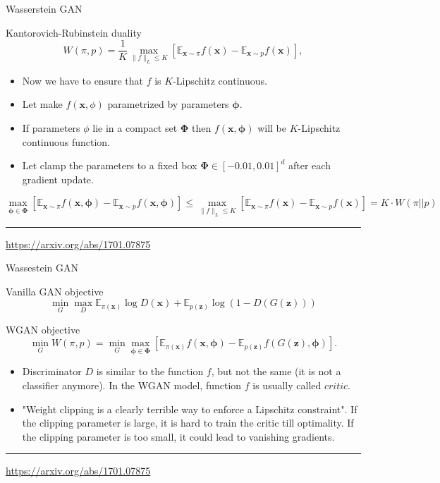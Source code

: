 \documentclass{beamer}
\newcommand{\bx}{\mathbf{x}}
\newcommand{\bz}{\mathbf{z}}
\newcommand{\bbE}{\mathbb{E}}
\newcommand{\bphi}{\boldsymbol{\phi}}
\begin{document}
\begin{frame}{Wasserstein GAN}
		\begin{block}{Kantorovich-Rubinstein duality}
		\[
			W(\pi, p) = \frac{1}{K} \max_{\| f \|_L \leq K} \left[ \bbE_{\bx \sim \pi} f(\bx)  - \bbE_{\bx \sim p} f(\bx)\right],
		\]
	\end{block}
	\begin{itemize}
		\item Now we have to ensure that $f$ is $K$-Lipschitz continuous.
		\item Let make $f(\bx, \phi)$ parametrized by parameters $\bphi$.
		\item If parameters $\phi$ lie in a compact set $\boldsymbol{\Phi}$ then $f(\bx, \bphi)$ will be $K$-Lipschitz continuous function. 
		\item Let clamp the parameters to a fixed box $\boldsymbol{\Phi} \in [-0.01, 0.01]^d$ after each gradient update.
	\end{itemize}
	{\footnotesize
	\[
		 \max_{\bphi \in \boldsymbol{\Phi}} \left[ \bbE_{\bx \sim \pi} f(\bx, \bphi)  - \bbE_{\bx \sim p} f(\bx, \bphi )\right] \leq  \max_{\| f \|_L \leq K} \left[ \bbE_{\bx \sim \pi} f(\bx)  - \bbE_{\bx \sim p} f(\bx)\right] = K \cdot W(\pi || p)
	\]}
	\vfill
	\hrule\medskip 
	{\scriptsize \href{https://arxiv.org/abs/1701.07875}{https://arxiv.org/abs/1701.07875}}
\end{frame}
\begin{frame}{Wassestein GAN}
	\begin{block}{Vanilla GAN objective}
		\vspace{-0.3cm}
		\[
			\min_{G} \max_D \bbE_{\pi(\bx)} \log D(\bx) + \bbE_{p(\bz)} \log (1 - D(G(\bz)))
		\]
	\end{block}
	\begin{block}{WGAN objective}
		\vspace{-0.6cm}
		\[
		\min_{G} W(\pi, p) = \min_{G} \max_{\bphi \in \boldsymbol{\Phi}} \left[ \bbE_{\pi(\bx)} f(\bx, \bphi)  - \bbE_{p(\bz)} f(G(\bz), \bphi )\right].
		\]
	\end{block}
	\begin{itemize}
		\item Discriminator $D$ is similar to the function $f$, but not the same (it is not a classifier anymore). In the WGAN model, function $f$ is usually called $\textit{critic}$.
		\item "Weight clipping is a clearly terrible way to enforce a Lipschitz constraint". If the clipping parameter is large, it is hard to train the critic till optimality. If the clipping parameter is too small, it could lead to vanishing gradients.
	\end{itemize}
	\vfill
	\hrule\medskip 
	{\scriptsize \href{https://arxiv.org/abs/1701.07875}{https://arxiv.org/abs/1701.07875}}
\end{frame}
\end{document}
